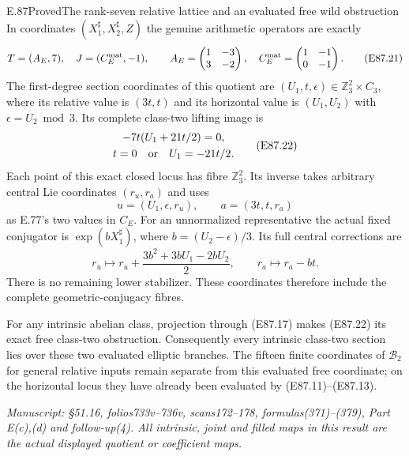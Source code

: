 \begin{statement}{E.87}{Proved}{The rank-seven relative lattice and an evaluated free wild obstruction}
In coordinates $(X_1^\sharp,X_2^\sharp,Z)$ the
genuine arithmetic operators are exactly
\[
 T=(A_E,7),\quad J=(C_E^{\rm mat},-1),\qquad
 A_E=\begin{pmatrix}1&-3\\3&-2\end{pmatrix},\quad
 C_E^{\rm mat}=\begin{pmatrix}1&-1\\0&-1\end{pmatrix}.
 \tag{E87.21}
\]
The first-degree section coordinates of this
quotient are $(U_1,t,\epsilon)\in\mathbb Z_3^2\times C_3$,
where its relative value is $(3t,t)$ and its
horizontal value is $(U_1,U_2)$ with
$\epsilon=U_2\bmod3$. Its complete class-two
lifting image is
\[
 \begin{gathered}
              -7t(U_1+21t/2)=0,\\
              t=0\quad\hbox{or}\quad U_1=-21t/2.
 \end{gathered}
 \tag{E87.22}
\]
Each point of this exact closed locus has fibre
$\mathbb Z_3^2$. Its inverse takes arbitrary
central Lie coordinates $(r_u,r_a)$ and uses
\[
      u=(U_1,\epsilon,r_u),\qquad
      a=(3t,t,r_a)
 \tag{E87.23}
\]
as E.77's two values in $C_E$.
For an unnormalized representative the actual fixed
conjugator is $\exp(bX_1^\sharp)$, where
$b=(U_2-\epsilon)/3$. Its full central corrections are
\[
 r_u\longmapsto r_u+\frac{3b^2+3bU_1-2bU_2}{2},
 \qquad r_a\longmapsto r_a-bt.
 \tag{E87.24}
\]
There is no remaining lower stabilizer. These
coordinates therefore include the complete
geometric-conjugacy fibres.

For any intrinsic abelian class, projection through
(E87.17) makes (E87.22) its exact free
class-two obstruction. Consequently every
intrinsic class-two section lies over these two
evaluated elliptic branches. The fifteen finite
coordinates of $\mathcal B_2$ for general relative
inputs remain separate from this evaluated free
coordinate; on the horizontal locus they have
already been evaluated by (E87.11)--(E87.13).

\emph{Manuscript: \S51.16, folios733v--736v,
scans172--178, formulas(371)--(379), Part E(c),(d)
and follow-up(4). All intrinsic, joint and filled
maps in this result are the actual displayed
quotient or coefficient maps.}
\end{statement}

